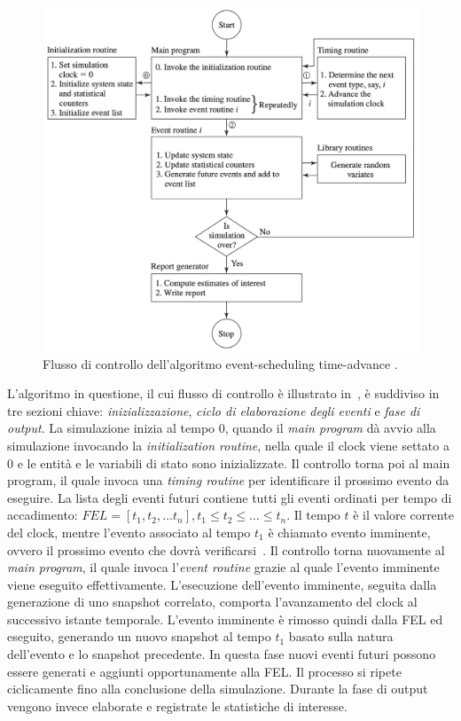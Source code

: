 \documentclass[12pt,a4paper,openright,twoside]{book}
\begin{document}
\begin{figure}
    \centering
    \includegraphics[width=.90\linewidth]{figures/discrete-event-simulation/time-advance-flow.png}
    \caption{Flusso di controllo dell'algoritmo event-scheduling time-advance \cite{Law15}.}
    \label{fig:next-event-flow}
\end{figure}

L'algoritmo in questione, il cui flusso di controllo è illustrato in~, è suddiviso in tre sezioni chiave: \textit{inizializzazione}, \textit{ciclo di elaborazione degli eventi} e \textit{fase di output}.
La simulazione inizia al tempo 0, quando il \textit{main program} dà avvio alla simulazione invocando la \textit{initialization routine}, nella quale il clock viene settato a 0 e le entità e le variabili di stato sono inizializzate.
Il controllo torna poi al main program, il quale invoca una \textit{timing routine} per identificare il prossimo evento da eseguire.
La lista degli eventi futuri contiene tutti gli eventi ordinati per tempo di accadimento: $FEL = [t_1, t_2, \dots t_n], t_1 \leq t_2 \leq \dots \leq t_n$. 
Il tempo $t$ è il valore corrente del clock, mentre l'evento associato al tempo $t_1$ è chiamato evento imminente, ovvero il prossimo evento che dovrà verificarsi~\cite{DBLP:books/daglib/0034857}.
Il controllo torna nuovamente al \textit{main program}, il quale invoca l'\textit{event routine} grazie al quale l'evento imminente viene eseguito effettivamente. 
L'esecuzione dell'evento imminente, seguita dalla generazione di uno snapshot correlato, comporta l'avanzamento del clock al successivo istante temporale. L'evento imminente è rimosso quindi dalla FEL ed eseguito, generando un nuovo snapshot al tempo $t_1$ basato sulla natura dell'evento e lo snapshot precedente. In questa fase nuovi eventi futuri possono essere generati e aggiunti opportunamente alla FEL.
Il processo si ripete ciclicamente fino alla conclusione della simulazione. 
Durante la fase di output vengono invece elaborate e registrate le statistiche di interesse. 
\end{document}
